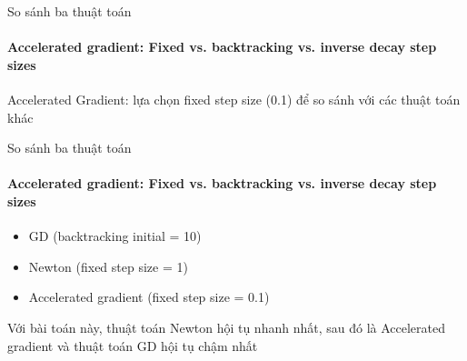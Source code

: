 \documentclass[10pt]{beamer}
\theoremstyle{remark}
\theoremstyle{definition}
\begin{document}
\begin{frame}{So sánh ba thuật toán}
	\framesubtitle{Accelerated gradient: Fixed vs. backtracking vs. inverse decay step sizes }
	
\begin{table}[]
	\centering
	\end{table}

	Accelerated Gradient: lựa chọn fixed step size (0.1) để so sánh với các thuật toán khác
\end{frame}


\begin{frame}{So sánh ba thuật toán}
	\framesubtitle{Accelerated gradient: Fixed vs. backtracking vs. inverse decay step sizes }
	\begin{itemize}
		\item GD (backtracking initial = 10)
		\item Newton (fixed step size = 1)
		\item Accelerated gradient (fixed step size = 0.1)

	\end{itemize}

	\begin{table}[]
		\centering
	\end{table}

	Với bài toán này, thuật toán Newton hội tụ nhanh nhất, sau đó là Accelerated gradient và thuật toán GD hội tụ chậm nhất
\end{frame}
\end{document}
